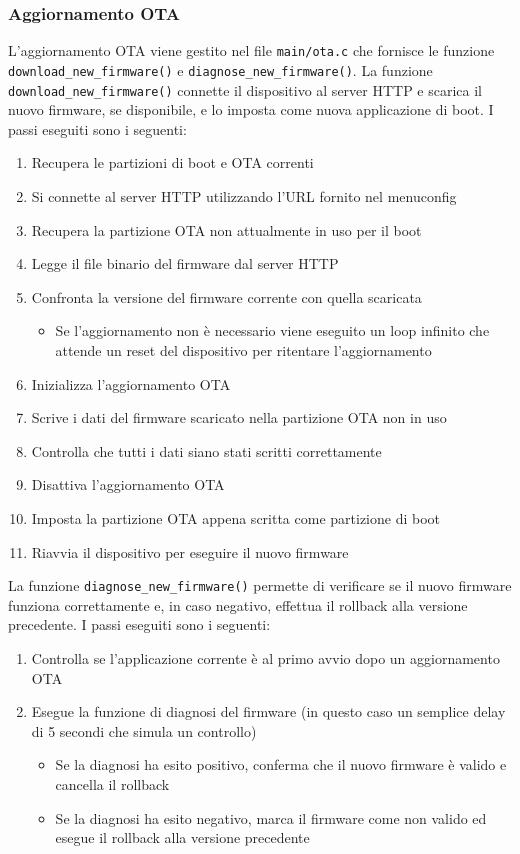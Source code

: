 \documentclass[a4paper]{article}
\begin{document}
\subsubsection{Aggiornamento OTA}
L'aggiornamento OTA viene gestito nel file \texttt{main/ota.c} che fornisce le funzione
\texttt{download\_new\_firmware()} e \texttt{diagnose\_new\_firmware()}. La funzione
\texttt{download\_new\_firmware()} connette il dispositivo al server HTTP e scarica
il nuovo firmware, se disponibile, e lo imposta come nuova applicazione di boot.
I passi eseguiti sono i seguenti:
\begin{enumerate}
  \item Recupera le partizioni di boot e OTA correnti
  \item Si connette al server HTTP utilizzando l'URL fornito nel menuconfig
  \item Recupera la partizione OTA non attualmente in uso per il boot
  \item Legge il file binario del firmware dal server HTTP
  \item Confronta la versione del firmware corrente con quella scaricata
    \begin{itemize}
      \item Se l'aggiornamento non è necessario viene eseguito un loop infinito
        che attende un reset del dispositivo per ritentare l'aggiornamento
    \end{itemize}
  \item Inizializza l'aggiornamento OTA
  \item Scrive i dati del firmware scaricato nella partizione OTA non in uso
  \item Controlla che tutti i dati siano stati scritti correttamente
  \item Disattiva l'aggiornamento OTA
  \item Imposta la partizione OTA appena scritta come partizione di boot
  \item Riavvia il dispositivo per eseguire il nuovo firmware
\end{enumerate}

\noindent
La funzione \texttt{diagnose\_new\_firmware()} permette di verificare se il nuovo
firmware funziona correttamente e, in caso negativo, effettua il rollback alla versione
precedente. I passi eseguiti sono i seguenti:
\begin{enumerate}
  \item Controlla se l'applicazione corrente è al primo avvio dopo un aggiornamento OTA
  \item Esegue la funzione di diagnosi del firmware (in questo caso un semplice delay di
    5 secondi che simula un controllo)
    \begin{itemize}
      \item Se la diagnosi ha esito positivo, conferma che il nuovo firmware è valido
        e cancella il rollback
      \item Se la diagnosi ha esito negativo, marca il firmware come non valido
        ed esegue il rollback alla versione precedente
    \end{itemize}
\end{enumerate}
\end{document}
